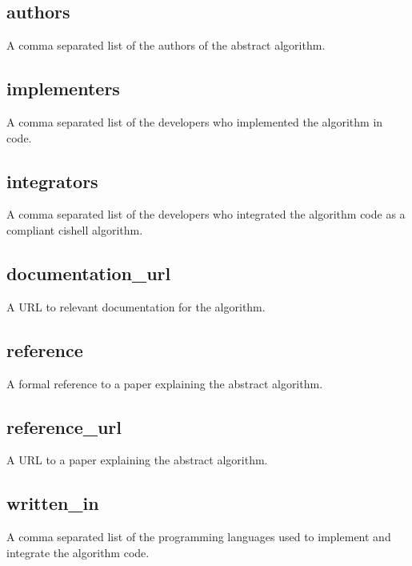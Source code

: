 \subsection*{authors}
A comma separated list of the authors of the abstract algorithm.

\subsection*{implementers}
A comma separated list of the developers who implemented the algorithm in code.

\subsection*{integrators}
A comma separated list of the developers who integrated the algorithm code as
a compliant cishell algorithm.

\subsection*{documentation\_url}
A URL to relevant documentation for the algorithm.

\subsection*{reference}
A formal reference to a paper explaining the abstract algorithm.

\subsection*{reference\_url}
A URL to a paper explaining the abstract algorithm.

\subsection*{written\_in}
A comma separated list of the programming languages used to implement and
integrate the algorithm code.
